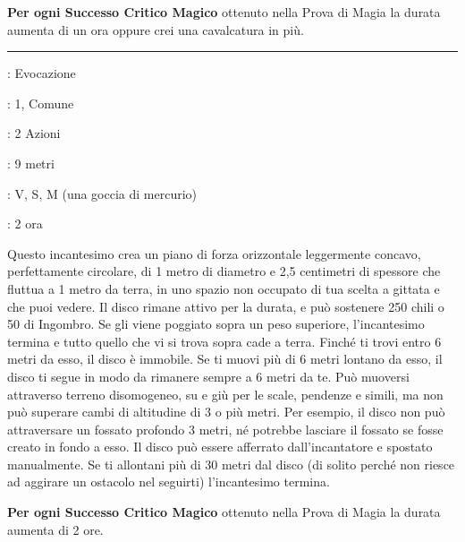 \begin{multicols}{2}
\textbf{Per ogni Successo Critico Magico} ottenuto nella Prova di Magia la durata aumenta di un ora oppure crei una cavalcatura in più.

\smallskip\noindent\rule{\linewidth}{2pt} \hypertarget{Disco Fluttuante}{}\medskip{}
\noindent
\begin{description}[noitemsep, topsep=0pt, parsep=0pt, partopsep=0pt, leftmargin=0cm, labelwidth=2.8cm]
	\item[\textbf{Lista di Magia}]: Evocazione
	\item[\textbf{Livello}]: 1, Comune
	\item[\textbf{T. di Lancio}]: 2 Azioni
	\item[\textbf{Gittata}]: 9 metri
	\item[\textbf{Componenti}]: V, S, M (una goccia di mercurio)
	\item[\textbf{Durata}]: 2 ora
\end{description}

Questo incantesimo crea un piano di forza orizzontale leggermente concavo, perfettamente circolare, di 1 metro di diametro e 2,5 centimetri di spessore che fluttua a 1 metro da terra, in uno spazio non occupato di tua scelta a gittata e che puoi vedere. Il disco rimane attivo per la durata, e può sostenere 250 chili o 50 di Ingombro. Se gli viene poggiato sopra un peso superiore, l'incantesimo termina e tutto quello che vi si trova sopra cade a terra. Finché ti trovi entro 6 metri da esso, il disco è immobile. Se ti muovi più di 6 metri lontano da esso, il disco ti segue in modo da rimanere sempre a 6 metri da te. Può muoversi attraverso terreno disomogeneo, su e giù per le scale, pendenze e simili, ma non può superare cambi di altitudine di 3 o più metri. Per esempio, il disco non può attraversare un fossato profondo 3 metri, né potrebbe lasciare il fossato se fosse creato in fondo a esso. Il disco può essere afferrato dall'incantatore e spostato manualmente. Se ti allontani più di 30 metri dal disco (di solito perché non riesce ad aggirare un ostacolo nel seguirti) l'incantesimo termina.

\textbf{Per ogni Successo Critico Magico} ottenuto nella Prova di Magia la durata aumenta di 2 ore.


\end{multicols}
